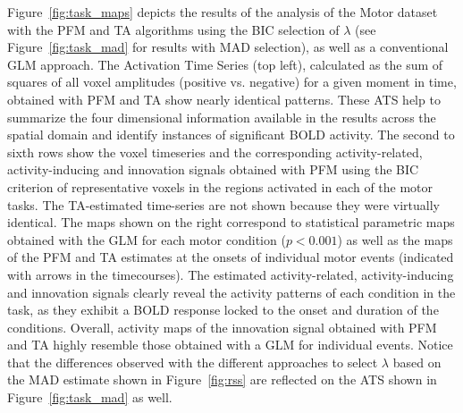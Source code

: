 Figure~\ref{fig:task_maps} depicts the results of the analysis of the Motor
dataset with the PFM and TA algorithms using the BIC selection of $\lambda$ (see
Figure~\ref{fig:task_mad} for results with MAD selection), as well as a
conventional GLM approach. The Activation Time Series (top left), calculated as
the sum of squares of all voxel amplitudes (positive vs. negative) for a given
moment in time, obtained with PFM and TA show nearly identical patterns. These
ATS help to summarize the four dimensional information available in the results
across the spatial domain and identify instances of significant BOLD activity.
The second to sixth rows show the voxel timeseries and the corresponding
activity-related, activity-inducing and innovation signals obtained with PFM
using the BIC criterion of representative voxels in the regions activated in
each of the motor tasks. The TA-estimated time-series are not shown because they
were virtually identical. The maps shown on the right correspond to statistical
parametric maps obtained with the GLM for each motor condition ($p < 0.001$) as
well as the maps of the PFM and TA estimates at the onsets of individual motor
events (indicated with arrows in the timecourses). The estimated
activity-related, activity-inducing and innovation signals clearly reveal the
activity patterns of each condition in the task, as they exhibit a BOLD response
locked to the onset and duration of the conditions. Overall, activity maps of
the innovation signal obtained with PFM and TA highly resemble those obtained
with a GLM for individual events. Notice that the differences observed with the
different approaches to select $\lambda$ based on the MAD estimate shown in
Figure~\ref{fig:rss} are reflected on the ATS shown in Figure~\ref{fig:task_mad}
as well.

